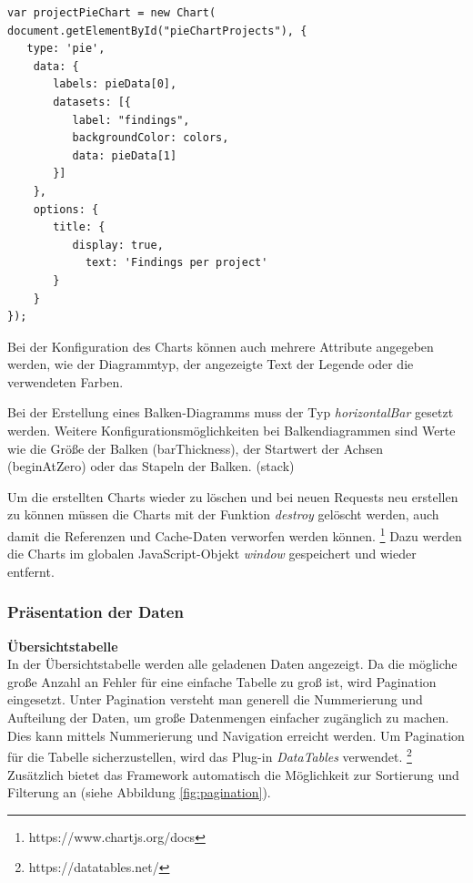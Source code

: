 \lstset{
  caption={Erstellen eines Kreisdiagramms mit Chart.js.}, 
  basicstyle=\small\ttfamily, 
  label=lst:pieChart, 
  language=Java,
  frame=single,
  breaklines=true, %
  postbreak=\mbox{\textcolor{red}{$\hookrightarrow$}\space},
}

\begin{samepage}%
	\begin{lstlisting}[float=tbhp]
var projectPieChart = new Chart(
document.getElementById("pieChartProjects"), {
   type: 'pie',
    data: {
       labels: pieData[0],
       datasets: [{
          label: "findings",
          backgroundColor: colors,
          data: pieData[1]
       }]
    },
    options: {
       title: {
          display: true,
            text: 'Findings per project'
       }
    }
});
	\end{lstlisting}
\end{samepage}

Bei der Konfiguration des Charts können auch mehrere Attribute angegeben werden, wie der Diagrammtyp, der angezeigte Text der Legende oder die verwendeten Farben. 

Bei der Erstellung eines Balken-Diagramms muss der Typ \textit{horizontalBar} gesetzt werden. Weitere Konfigurationsmöglichkeiten bei Balkendiagrammen sind Werte wie die Größe der Balken (barThickness), der Startwert der Achsen (beginAtZero) oder das Stapeln der Balken. (stack)

Um die erstellten Charts wieder zu löschen und bei neuen Requests neu erstellen zu können müssen die Charts mit der Funktion \textit{destroy} gelöscht werden, auch damit die Referenzen und Cache-Daten verworfen werden können. \footnote{https://www.chartjs.org/docs} Dazu werden die Charts im globalen JavaScript-Objekt \textit{window} gespeichert und wieder entfernt. 

\subsubsection{Präsentation der Daten}
\textbf{Übersichtstabelle} \\
In der Übersichtstabelle werden alle geladenen Daten angezeigt. Da die mögliche große Anzahl an Fehler für eine einfache Tabelle zu groß ist, wird Pagination eingesetzt. Unter Pagination versteht man generell die Nummerierung und Aufteilung der Daten, um große Datenmengen einfacher zugänglich zu machen.  ~\parencite{wieczorek2014mode} Dies kann mittels Nummerierung und Navigation erreicht werden. Um Pagination für die Tabelle sicherzustellen, wird das Plug-in \textit{DataTables} verwendet. \footnote{https://datatables.net/} Zusätzlich bietet das Framework automatisch die Möglichkeit zur Sortierung und Filterung an (siehe Abbildung \ref{fig:pagination}).

